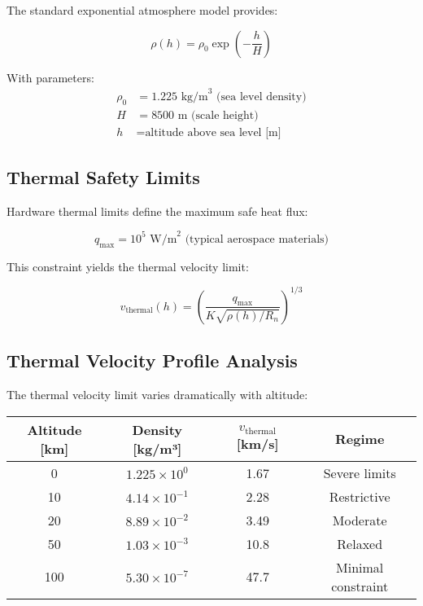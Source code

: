 \documentclass[12pt,a4paper]{article}
\begin{document}
The standard exponential atmosphere model provides:

\begin{equation}
\rho(h) = \rho_0 \exp\left(-\frac{h}{H}\right)
\end{equation}

With parameters:
\begin{align}
\rho_0 &= 1.225 \text{ kg/m}^3 \text{ (sea level density)} \\
H &= 8500 \text{ m (scale height)} \\
h &= \text{altitude above sea level [m]}
\end{align}

\subsection{Thermal Safety Limits}

Hardware thermal limits define the maximum safe heat flux:

\begin{equation}
q_{\max} = 10^5 \text{ W/m}^2 \text{ (typical aerospace materials)}
\end{equation}

This constraint yields the thermal velocity limit:

\begin{equation}
v_{\text{thermal}}(h) = \left(\frac{q_{\max}}{K \sqrt{\rho(h)/R_n}}\right)^{1/3}
\end{equation}

\subsection{Thermal Velocity Profile Analysis}

The thermal velocity limit varies dramatically with altitude:

\begin{center}
\begin{tabular}{|c|c|c|c|}
\hline
\textbf{Altitude [km]} & \textbf{Density [kg/m³]} & \textbf{$v_{\text{thermal}}$ [km/s]} & \textbf{Regime} \\
\hline
0 & $1.225 \times 10^{0}$ & 1.67 & Severe limits \\
10 & $4.14 \times 10^{-1}$ & 2.28 & Restrictive \\
20 & $8.89 \times 10^{-2}$ & 3.49 & Moderate \\
50 & $1.03 \times 10^{-3}$ & 10.8 & Relaxed \\
100 & $5.30 \times 10^{-7}$ & 47.7 & Minimal constraint \\
\hline
\end{tabular}
\end{center}
\end{document}

